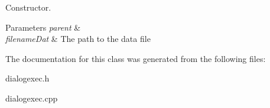 Constructor. 


\begin{DoxyParams}{Parameters}
{\em parent} & \\
\hline
{\em filename\-Dat} & The path to the data file \\
\hline
\end{DoxyParams}


The documentation for this class was generated from the following files\-:\begin{DoxyCompactItemize}
\item 
dialogexec.\-h\item 
dialogexec.\-cpp\end{DoxyCompactItemize}
